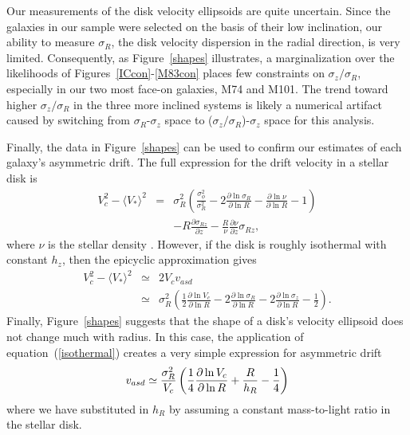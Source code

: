 \documentclass[12pt,preprint]{emulateapj}
\newcommand{\eg}{{e.g.,}}
\newcommand{\ie}{{i.e.,}}
\begin{document}
Our measurements of the disk velocity ellipsoids are quite uncertain.  Since the galaxies in our sample were selected on the basis of their low inclination, our ability to measure $\sigma_R$, the disk velocity dispersion in the radial direction, is very limited.  Consequently, as Figure~\ref{shapes} illustrates, a marginalization over the likelihoods of Figures~\ref{ICcon}-\ref{M83con} places few constraints on $\sigma_z/\sigma_R$, especially in our two most face-on galaxies, M74 and M101.  The trend toward higher $\sigma_z/\sigma_R$ in the three more inclined systems is likely a numerical artifact caused by switching from $\sigma_R$-$\sigma_z$ space to ($\sigma_z/\sigma_R$)-$\sigma_z$ space for this analysis.


Finally, the data in Figure~\ref{shapes} can be used to confirm our estimates of each galaxy's asymmetric drift.   The full expression for the drift velocity in a stellar disk is
\begin{eqnarray}
V_c^2 - \langle V_{\ast} \rangle^2 &=& \sigma_R^2 \left( \frac{\sigma_{\phi}^2}{\sigma_R^2} - 2 \frac{\partial \ln \sigma_R}{\partial \ln R} - \frac{\partial \ln \nu}{\partial \ln R} - 1 \right) \nonumber \\
& &- R\frac{\partial \sigma_{Rz}}{\partial z} - \frac{R}{\nu} \frac{\partial \nu}{\partial z} \sigma_{Rz},
\label{Jeans0}
\end{eqnarray}
where $\nu$ is the stellar density \citep{bt87}.  However, if the disk is roughly isothermal with constant $h_z$, then the epicyclic approximation gives
\begin{eqnarray}
V_c^2 - \langle V_{\ast} \rangle^2 &\simeq& 2 V_c v_{asd} \\
 &\simeq& \sigma_R^2 \left( \frac{1}{2} \frac{\partial \ln V_c}{\partial \ln R} - 2 \frac{\partial \ln \sigma_R}{\partial \ln R} - 2 \frac{\partial \ln \sigma_z}{\partial \ln R} - \frac{1}{2} \right). \nonumber
\label{Jeans1}
\end{eqnarray}
Finally, Figure~\ref{shapes} suggests that the shape of a disk's velocity ellipsoid does not change much with radius.  In this case, the application of equation~(\ref{isothermal}) creates a very simple expression for asymmetric drift
\begin{equation}
v_{asd} \simeq {\sigma_R^2 \over V_c} \left(\frac{1}{4} \frac{\partial \ln V_c}
{\partial \ln R} + \frac{R}{h_R} - \frac{1}{4} \right)
\label{Jeans2}
\end{equation}
where we have substituted in $h_R$ by assuming a constant mass-to-light ratio in the stellar disk.  
\end{document}
